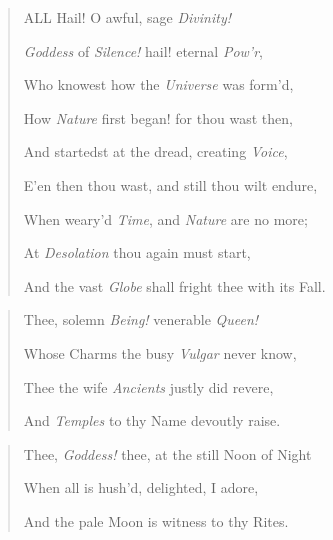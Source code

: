 \documentclass[a4paper, 11pt, oneside]{article}
\begin{document}
\bigskip

\begin{quotation}\LARGE
\hspace*{10mm}ALL Hail! O awful, sage \emph{Divinity!}

\emph{Goddess} of \emph{Silence!} hail! eternal \emph{Pow'r},

Who knowest how the \emph{Universe} was form'd,

How \emph{Nature} first began! for thou wast then,

And startedst at the dread, creating \emph{Voice},

E'en then thou wast, and still thou wilt endure,

When weary'd \emph{Time}, and \emph{Nature} are no more;

At \emph{Desolation} thou again must start,

And the vast \emph{Globe} shall fright thee with its Fall.
\end{quotation}
\begin{quotation}\LARGE
\hspace*{10mm}Thee, solemn \emph{Being!} venerable \emph{Queen!}

Whose Charms the busy \emph{Vulgar} never know,

Thee the wife \emph{Ancients} justly did revere,

And \emph{Temples} to thy Name devoutly raise.
\end{quotation}
\begin{quotation}\LARGE
\hspace*{10mm}Thee, \emph{Goddess!} thee, at the still Noon of Night

When all is hush'd, delighted, I adore,

And the pale Moon is witness to thy Rites.
\end{quotation}
\end{document}
